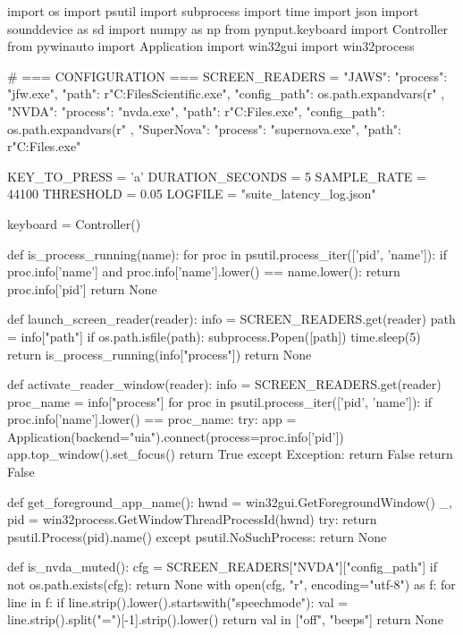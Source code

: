 \begin{pyverbatim}
	import os
	import psutil
	import subprocess
	import time
	import json
	import sounddevice as sd
	import numpy as np
	from pynput.keyboard import Controller
	from pywinauto import Application
	import win32gui
	import win32process

	# === CONFIGURATION ===
	SCREEN_READERS = {
	"JAWS": {
	"process": "jfw.exe",
	"path": r"C:\Program Files\Freedom Scientific\JAWS{}\jfw.exe",
	"config_path": os.path.expandvars(r"%
	},
	"NVDA": {
	"process": "nvda.exe",
	"path": r"C:\Program Files\NVDA\nvda.exe",
	"config_path": os.path.expandvars(r"%
	},
	"SuperNova": {
	"process": "supernova.exe",
	"path": r"C:\Program Files\Dolphin\SuperNova\supernova.exe"
	}
	}

	KEY_TO_PRESS = 'a'
	DURATION_SECONDS = 5
	SAMPLE_RATE = 44100
	THRESHOLD = 0.05
	LOGFILE = "suite_latency_log.json"

	keyboard = Controller()

	def is_process_running(name):
	for proc in psutil.process_iter(['pid', 'name']):
	if proc.info['name'] and proc.info['name'].lower() == name.lower():
	return proc.info['pid']
	return None

	def launch_screen_reader(reader):
	info = SCREEN_READERS.get(reader)
	path = info["path"]
	if os.path.isfile(path):
	subprocess.Popen([path])
	time.sleep(5)
	return is_process_running(info["process"])
	return None

	def activate_reader_window(reader):
	info = SCREEN_READERS.get(reader)
	proc_name = info["process"]
	for proc in psutil.process_iter(['pid', 'name']):
	if proc.info['name'].lower() == proc_name:
	try:
	app = Application(backend="uia").connect(process=proc.info['pid'])
	app.top_window().set_focus()
	return True
	except Exception:
	return False
	return False

	def get_foreground_app_name():
	hwnd = win32gui.GetForegroundWindow()
	_, pid = win32process.GetWindowThreadProcessId(hwnd)
	try:
	return psutil.Process(pid).name()
	except psutil.NoSuchProcess:
	return None

	def is_nvda_muted():
	cfg = SCREEN_READERS["NVDA"]["config_path"]
	if not os.path.exists(cfg):
	return None
	with open(cfg, "r", encoding="utf-8") as f:
	for line in f:
	if line.strip().lower().startswith("speechmode"):
	val = line.strip().split("=")[-1].strip().lower()
	return val in ["off", "beeps"]
	return None


\end{pyverbatim}
